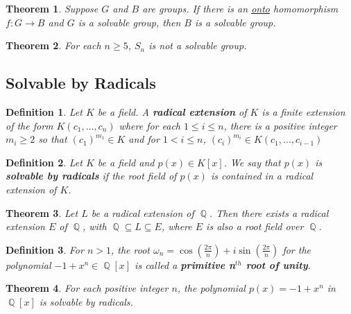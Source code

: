 \documentclass[letterpaper, 12pt]{article}
\DeclareMathOperator{\Q}{\mathbb{Q}}
\newtheorem{defn}{Definition}
\newtheorem{thm}{Theorem}
\begin{document}
			\begin{thm}
			Suppose $G$ and $B$ are groups.
			If there is an \underline{onto} homomorphism $f : G \to B$ and $G$ is a solvable group, then $B$ is a solvable group.
			\end{thm}

			\begin{thm}
			For each $n \geq 5$, $S_{n}$ is not a solvable group.
			\end{thm}

		\subsection{Solvable by Radicals}
		\label{sec:solvable_by_radicals}
			\setcounter{defn}{8}
			\begin{defn}
			Let $K$ be a field.
			A \textbf{radical extension} of $K$ is a finite extension of the form $K(c_{1},\dots,c_{n})$ where for each $1 \leq i \leq n$, there is a positive integer $m_{i} \geq 2$ so that $(c_{1})^{m_{1}} \in K$ and for $1 < i \leq n$, $(c_{i})^{m_{i}} \in K(c_{1},\dots,c_{i-1})$
			\end{defn}

			\setcounter{defn}{10}
			\begin{defn}
			Let $K$ be a field and $p(x) \in K[x]$.
			We say that $p(x)$ is \textbf{solvable by radicals} if the root field of $p(x)$ is contained in a radical extension of $K$.
			\end{defn}

			\setcounter{thm}{12}
			\begin{thm}
			Let $L$ be a radical extension of $\Q$.
			Then there exists a radical extension $E$ of $\Q$, with $\Q \subseteq L \subseteq E$, where $E$ is also a root field over $\Q$.
			\end{thm}

			\setcounter{defn}{13}
			\begin{defn}
			For $n > 1$, the root $\omega_{n} = \cos{\left( \frac{2\pi}{n} \right)} + i \sin{\left( \frac{2\pi}{n} \right)}$ for the polynomial $-1 + x^{n} \in \Q[x]$ is called a \textbf{primitive n$^{th}$ root of unity}.
			\end{defn}

			\setcounter{thm}{14}
			\begin{thm}
			For each positive integer $n$, the polynomial $p(x) = -1 + x^{n}$ in $\Q[x]$ is solvable by radicals.
			\end{thm}
\end{document}
